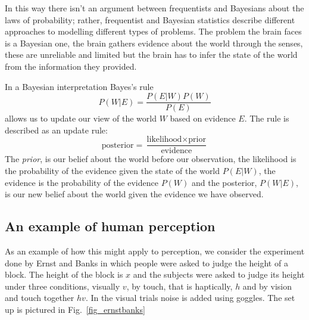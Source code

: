 \documentclass[12pt]{article}
\begin{document}
In this way there isn't an argument between frequentists and Bayesians
about the laws of probability; rather, frequentist and Bayesian
statistics describe different approaches to modelling different types
of problems. The problem the brain faces is a Bayesian one, the brain
gathers evidence about the world through the senses, these are
unreliable and limited but the brain has to infer the state of the
world from the information they provided.

In a Bayesian interpretation Bayes's rule 
\begin{equation}
P(W|E)=\frac{P(E|W)P(W)}{P(E)}
\end{equation}
allows us to update our view of the world $W$ based on evidence $E$. The rule is described as an update rule:
\begin{equation}
\mbox{posterior}=\frac{\mbox{likelihood}\times \mbox{prior}}{\mbox{evidence}}
\end{equation}
The \textsl{prior}, is our belief about the world before our
observation, the likelihood is the probability of the evidence given
the state of the world $P(E|W)$, the evidence is the probability of
the evidence $P(W)$ and the posterior, $P(W|E)$, is our new belief
about the world given the evidence we have observed.

\subsection*{An example of human perception}

As an example of how this might apply to perception, we consider the
experiment done by Ernst and Banks \cite{ErnstBanks2002} in which
people were asked to judge the height of a block. The height of the
block is $x$ and the subjects were asked to judge its height under
three conditions, visually $v$, by touch, that is haptically, $h$ and
by vision and touch together $hv$. In the visual trials noise is added
using goggles. The set up is pictured in Fig.~\ref{fig_ernstbanks}
\end{document}
